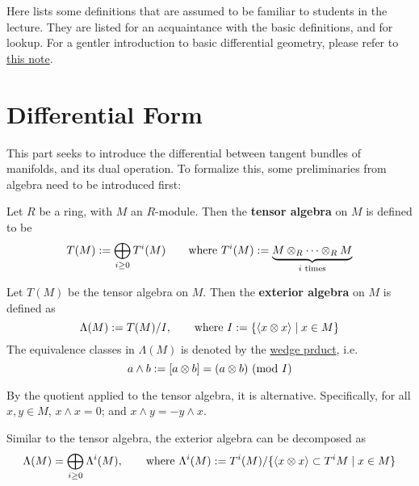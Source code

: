 \documentclass{article}
\begin{document}

\tableofcontents
\newpage

\def\open{\mathcal{O}}

Here lists some definitions that are assumed to be familiar to students in the lecture. They are listed for an acquaintance with the basic definitions, and for lookup. For a gentler introduction to basic differential geometry, please refer to \href{https://github.com/ARessegetesStery/MATH437-Notes}{this note}.

\section{Differential Form}

\textstart
This part seeks to introduce the differential between tangent bundles of manifolds, and its dual operation. To formalize this, some preliminaries from algebra need to be introduced first:

\begin{definition}
    Let $R$ be a ring, with $M$ an $R$-module. Then the \textbf{tensor algebra} on $M$ is defined to be
    \[
        T(M) := \bigoplus_{i \geq 0} T^i(M) \qquad\text{where } T^i(M) := \underbrace{M \otimes_R \cdots \otimes_R M}_{i \text{ times}}
    \]
\end{definition}

\begin{definition}
    Let $T(M)$ be the tensor algebra on $M$. Then the \textbf{exterior algebra} on $M$ is defined as
    \[
        \Lambda(M) := T(M) / I , \qquad \text{where } I := \left\{ \left\langle x \otimes x \right\rangle \mid x \in M \right\}
    \]
    The equivalence classes in $\Lambda(M)$ is denoted by the \underline{wedge prduct}, i.e.
    \[
        a \wedge b := [a \otimes b] = (a \otimes b) \ (\text{mod}\ I)
    \]
\end{definition}

\begin{remark}
    By the quotient applied to the tensor algebra, it is alternative. Specifically, for all $x, y \in M$, $x \wedge x = 0$; and $x \wedge y = -y \wedge x$.
\end{remark}

\begin{remark}
    Similar to the tensor algebra, the exterior algebra can be decomposed as
    \[
        \Lambda(M) = \bigoplus_{i \geq 0} \Lambda^i(M), \qquad \text{where } \Lambda^i(M) := T^i(M) / \{ \left\langle x \otimes x \right\rangle \subset T^i M \mid x \in M \}
    \]
\end{remark}
\end{document}
